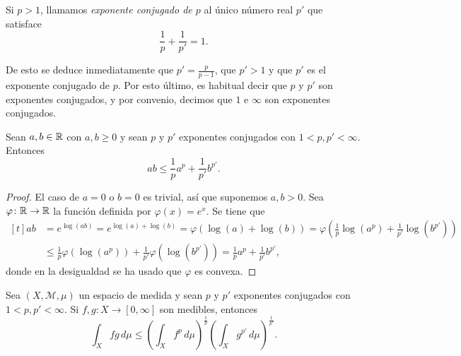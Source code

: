 \documentclass[a4paper, 11pt, oneside]{report}
\begin{document}
\begin{definition}
  Si $ p >1$, llamamos \emph{exponente conjugado de $p$} al único número real $p'$ que satisface
  \[\frac{1}{p}+\frac{1}{p'} = 1.\]
\end{definition}

De esto se deduce inmediatamente que $p'=\frac{p}{p-1}$, que $p'>1$ y que $p'$ es el exponente conjugado de $p$. Por esto último, es habitual decir que $p$ y $p'$ son exponentes conjugados, y por convenio, decimos que $1$ e $\infty$ son exponentes conjugados.

\begin{theorem}\label{teo:1.2.5}
  Sean $a,b \in \mathbb R$ con $a,b\geq 0$ y sean $p$ y $p'$ exponentes conjugados con $1<p,p'<\infty$. Entonces
  \[ab \leq \frac{1}{p}a^p+\frac{1}{p'}b^{p'}.\]
\end{theorem}

\begin{proof}
  El caso de $a = 0$ o $b = 0$ es trivial, así que suponemos $a,b>0$. Sea $\varphi \colon \mathbb R \to \mathbb R$ la función definida por $\varphi(x)=e^x$. Se tiene que
  \[\begin{aligned}[t]
    ab &= e^{\log(ab)} = e^{\log(a)+\log(b)} = \varphi(\log(a)+\log(b)) = \varphi\left(\frac{1}{p}\log(a^p)+\frac{1}{p'}\log(b^{p'})\right) \\
    & \leq \frac{1}{p}\varphi(\log(a^p))+\frac{1}{p'}\varphi(\log(b^{p'})) = \frac{1}{p}a^p+\frac{1}{p'}b^{p'},
  \end{aligned}\]
  donde en la desigualdad se ha usado que $\varphi$ es convexa.
\end{proof}

\begin{theorem}\label{teo:1.2.6}
  Sea $(X,\mathcal{M},\mu)$ un espacio de medida y sean $p$ y $p'$ exponentes conjugados con $1<p,p'<\infty$. Si $f,g \colon X \to [0,\infty]$ son medibles, entonces
  \[\int_X fg \, d\mu \leq \left(\int_X f^p \, d\mu\right)^{\frac{1}{p}}\left(\int_X g^{p'} \, d\mu\right)^{\frac{1}{p'}}.\]
\end{theorem}
\end{document}
